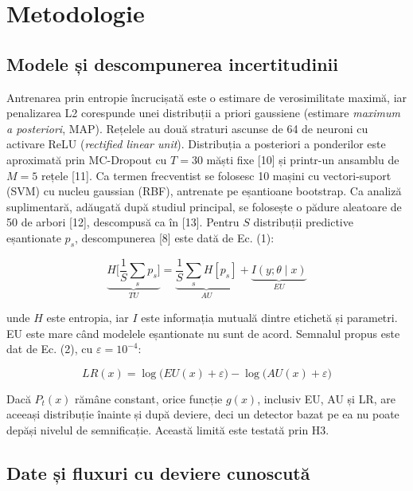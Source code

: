 \documentclass[12pt,a4paper]{article}
\begin{document}
\hypertarget{metodologie}{%
\section{Metodologie}\label{metodologie}}

\hypertarget{modele-ux219i-descompunerea-incertitudinii}{%
\subsection{Modele și descompunerea
incertitudinii}\label{modele-ux219i-descompunerea-incertitudinii}}

Antrenarea prin entropie încrucișată este o estimare de verosimilitate
maximă, iar penalizarea L2 corespunde unei distribuții a priori
gaussiene (estimare \emph{maximum a posteriori}, MAP). Rețelele au două
straturi ascunse de 64 de neuroni cu activare ReLU (\emph{rectified
linear unit}). Distribuția a posteriori a ponderilor este aproximată
prin MC-Dropout cu \(T=30\) măști fixe {[}10{]} și printr-un ansamblu de
\(M=5\) rețele {[}11{]}. Ca termen frecventist se folosesc 10 mașini cu
vectori-suport (SVM) cu nucleu gaussian (RBF), antrenate pe eșantioane
bootstrap. Ca analiză suplimentară, adăugată după studiul principal, se
folosește o pădure aleatoare de 50 de arbori {[}12{]}, descompusă ca în
{[}13{]}. Pentru \(S\) distribuții predictive eșantionate \(p_s\),
descompunerea {[}8{]} este dată de Ec. (1):

\begin{equation}
\underbrace{H\Big[\frac{1}{S}\sum_{s} p_s\Big]}_{TU} = \underbrace{\frac{1}{S}\sum_{s} H[p_s]}_{AU} + \underbrace{I(y;\theta \mid x)}_{EU}
\end{equation}

unde \(H\) este entropia, iar \(I\) este informația mutuală dintre
etichetă și parametri. EU este mare când modelele eșantionate nu sunt de
acord. Semnalul propus este dat de Ec. (2), cu \(\varepsilon=10^{-4}\):

\begin{equation}
LR(x)=\log\big(EU(x)+\varepsilon\big)-\log\big(AU(x)+\varepsilon\big)
\end{equation}

Dacă \(P_t(x)\) rămâne constant, orice funcție \(g(x)\), inclusiv EU, AU
și LR, are aceeași distribuție înainte și după deviere, deci un detector
bazat pe ea nu poate depăși nivelul de semnificație. Această limită este
testată prin H3.

\hypertarget{date-ux219i-fluxuri-cu-deviere-cunoscutux103}{%
\subsection{Date și fluxuri cu deviere
cunoscută}\label{date-ux219i-fluxuri-cu-deviere-cunoscutux103}}
\end{document}
